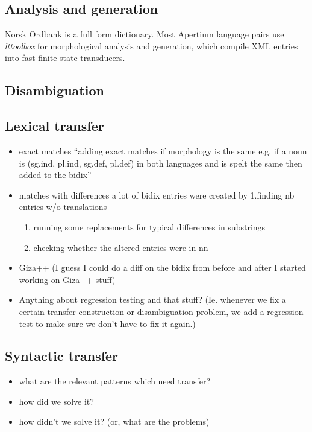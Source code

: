 \documentclass[11pt]{article}
\begin{document}
\subsection{Analysis and generation}
\label{sec-3.2}

Norsk Ordbank is a full form dictionary. Most Apertium language pairs
use \emph{lttoolbox} for morphological analysis and generation, which
compile XML entries into fast finite state transducers.
\subsection{Disambiguation}
\label{sec-3.3}


\subsection{Lexical transfer}
\label{sec-3.4}


\begin{itemize}
\item exact matches ``adding exact matches if morphology is the same
  e.g. if a noun is (sg.ind, pl.ind, sg.def, pl.def) in both
  languages and is spelt the same then added to the bidix''
\item matches with differences a lot of bidix entries were created by
  1.finding nb entries w/o translations

\begin{enumerate}
\item running some replacements for typical differences in substrings
\item checking whether the altered entries were in nn
\end{enumerate}

\item Giza++ (I guess I could do a diff on the bidix from before and after
  I started working on Giza++ stuff)
\item Anything about regression testing and that stuff? (Ie. whenever we
  fix a certain transfer construction or disambiguation problem, we
  add a regression test to make sure we don't have to fix it again.)
\end{itemize}
\subsection{Syntactic transfer}
\label{sec-3.5}

\begin{itemize}
\item what are the relevant patterns which need transfer?
\item how did we solve it?
\item how didn't we solve it? (or, what are the problems)
\end{itemize}
\end{document}

